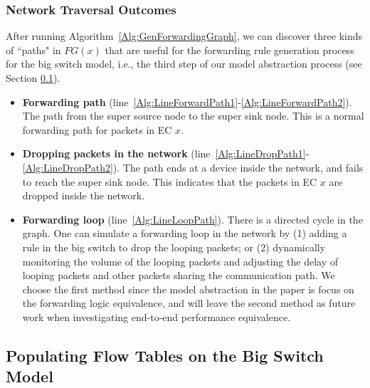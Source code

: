 \subsubsection{Network Traversal Outcomes}
After running Algorithm~\ref{Alg:GenForwardingGraph}, we can discover three kinds of ``paths" in $FG(x)$ that are useful for the forwarding rule generation process for the big switch model, i.e., the third step of our model abstraction process (see Section \ref{sec:thirdstep}).

\begin{itemize}
\item \textbf{Forwarding path} (line~\ref{Alg:LineForwardPath1}-\ref{Alg:LineForwardPath2}).
        The path from the super source node to the super sink node.
        This is a normal forwarding path for packets in EC $x$.

\item \textbf{Dropping packets in the network} (line~\ref{Alg:LineDropPath1}-\ref{Alg:LineDropPath2}).
        The path ends at a device inside the network, and fails to reach the super sink node. This indicates that the packets in EC $x$ are dropped inside the network.

\item \textbf{Forwarding loop} (line~\ref{Alg:LineLoopPath}).
        There is a directed cycle in the graph. One can simulate a forwarding loop in the network by (1) adding a rule in the big switch to drop the looping packets; or (2) dynamically monitoring the volume of the looping packets and adjusting the delay of looping packets and other packets sharing the communication path. We choose the first method since the model abstraction in the paper is focus on the forwarding logic equivalence, and will leave the second method as future work when investigating end-to-end performance equivalence.
\end{itemize}

\subsection{Populating Flow Tables on the Big Switch Model}\label{sec:thirdstep}

